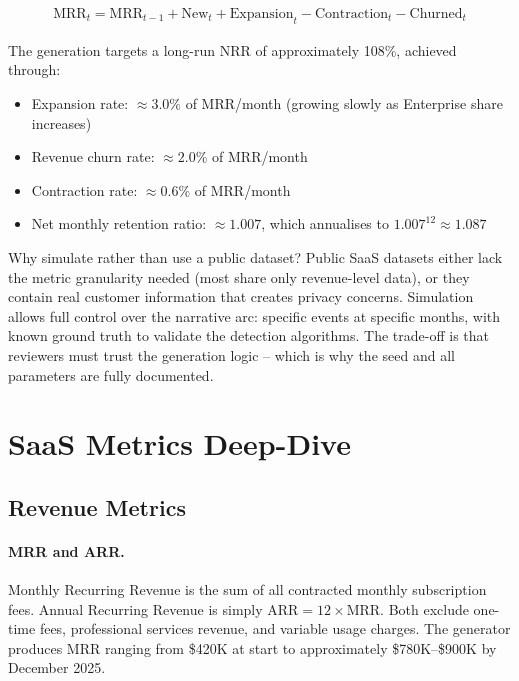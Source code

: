 \begin{align}
  \text{MRR}_{t} = \text{MRR}_{t-1} + \text{New}_{t} + \text{Expansion}_{t} - \text{Contraction}_{t} - \text{Churned}_{t}
\end{align}

The generation targets a long-run NRR of approximately 108\%, achieved through:
\begin{itemize}
  \item Expansion rate: \(\approx 3.0\%\) of MRR/month (growing slowly as Enterprise share increases)
  \item Revenue churn rate: \(\approx 2.0\%\) of MRR/month
  \item Contraction rate: \(\approx 0.6\%\) of MRR/month
  \item Net monthly retention ratio: \(\approx 1.007\), which annualises to \(1.007^{12} \approx 1.087\)
\end{itemize}

\begin{decisionbox}
Why simulate rather than use a public dataset? Public SaaS datasets either lack the metric granularity needed (most share only revenue-level data), or they contain real customer information that creates privacy concerns. Simulation allows full control over the narrative arc: specific events at specific months, with known ground truth to validate the detection algorithms. The trade-off is that reviewers must trust the generation logic -- which is why the seed and all parameters are fully documented.
\end{decisionbox}

\section{SaaS Metrics Deep-Dive}
\label{sec:kpi-metrics}


\subsection{Revenue Metrics}

\paragraph{MRR and ARR.}
Monthly Recurring Revenue is the sum of all contracted monthly subscription fees. Annual Recurring Revenue is simply \(\text{ARR} = 12 \times \text{MRR}\). Both exclude one-time fees, professional services revenue, and variable usage charges. The generator produces MRR ranging from \$420K at start to approximately \$780K--\$900K by December 2025.

